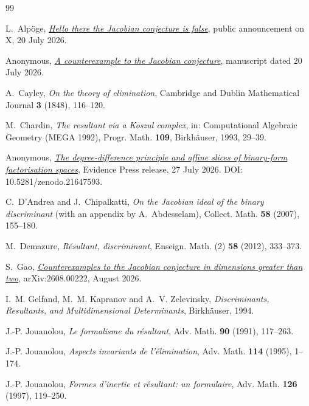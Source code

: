 \documentclass[11pt,reqno]{amsart}
\theoremstyle{definition}
\theoremstyle{remark}
\begin{document}
\begingroup
\footnotesize
\setlength{\parskip}{0pt}
\begin{thebibliography}{99}

L.~Alp\"oge,
\emph{\href{https://x.com/__alpoge__/status/2079028340955197566}
{Hello there the Jacobian conjecture is false}},
public announcement on X, 20 July 2026.

Anonymous,
\emph{\href{https://www.ulam.ai/research/jacobian.pdf}
{A counterexample to the Jacobian conjecture}},
manuscript dated 20 July 2026.

A.~Cayley,
\emph{On the theory of elimination},
Cambridge and Dublin Mathematical Journal \textbf{3} (1848), 116--120.

M.~Chardin,
\emph{The resultant via a Koszul complex},
in: Computational Algebraic Geometry (MEGA 1992),
Progr. Math. \textbf{109}, Birkh\"auser, 1993, 29--39.

Anonymous,
\emph{\href{https://doi.org/10.5281/zenodo.21647593}
{The degree-difference principle and affine slices of binary-form
factorisation spaces}},
Evidence Press release, 27 July 2026.
DOI: 10.5281/zenodo.21647593.

C.~D'Andrea and J.~Chipalkatti,
\emph{On the Jacobian ideal of the binary discriminant} (with an
appendix by A.~Abdesselam),
Collect. Math. \textbf{58} (2007), 155--180.

M.~Demazure,
\emph{R\'esultant, discriminant},
Enseign. Math. (2) \textbf{58} (2012), 333--373.

S.~Gao,
\emph{\href{https://arxiv.org/abs/2608.00222}
{Counterexamples to the Jacobian conjecture in dimensions greater
than two}},
arXiv:2608.00222, August 2026.

I.~M. Gelfand, M.~M. Kapranov and A.~V. Zelevinsky,
\emph{Discriminants, Resultants, and Multidimensional Determinants},
Birkh\"auser, 1994.

J.-P. Jouanolou,
\emph{Le formalisme du r\'esultant},
Adv. Math. \textbf{90} (1991), 117--263.

J.-P. Jouanolou,
\emph{Aspects invariants de l'\'elimination},
Adv. Math. \textbf{114} (1995), 1--174.

J.-P. Jouanolou,
\emph{Formes d'inertie et r\'esultant: un formulaire},
Adv. Math. \textbf{126} (1997), 119--250.


\end{thebibliography}
\end{document}
